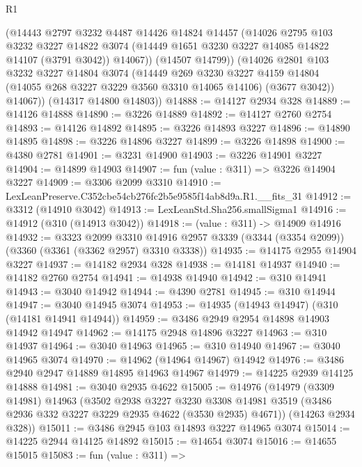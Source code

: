 \begin{lexlean}{R1}
\begin{coremodule}
          (@14443
            @2797
            @3232
            @4487
            @14426
            @14824
            @14457
            (@14026
              @2795
              @103
              @3232
              @3227
              @14822
              @3074
              (@14449 @1651 @3230 @3227 @14085 @14822 @14107 (@3791 @3042))
              @14067))
          (@14507 @14799))
        (@14026
          @2801
          @103
          @3232
          @3227
          @14804
          @3074
          (@14449
            @269
            @3230
            @3227
            @4159
            @14804
            (@14055 @268 @3227 @3229 @3560 @3310 @14065 @14106)
            (@3677 @3042))
          @14067))
      (@14317 @14800 @14803))
@14888 := @14127 @2934 @328
@14889 := @14126 @14888
@14890 := @3226 @14889
@14892 := @14127 @2760 @2754
@14893 := @14126 @14892
@14895 := @3226 @14893 @3227
@14896 := @14890 @14895
@14898 := @3226 @14896 @3227
@14899 := @3226 @14898
@14900 := @4380 @2781
@14901 := @3231 @14900
@14903 := @3226 @14901 @3227
@14904 := @14899 @14903
@14907 := fun (value : @311) => @3226 @14904 @3227
@14909 := @3306 @2099 @3310
@14910 := LexLeanPreserve.C352cbe54cb276fc2b5e9585f14ab8d9a.R1.__fits_31
@14912 := @3312 (@14910 @3042)
@14913 := LexLeanStd.Sha256.smallSigma1
@14916 := @14912 (@310 (@14913 @3042))
@14918 := (value : @311) -> @14909 @14916
@14932 := @3323
    @2099
    @3310
    @14916
    @2957
    @3339
    (@3344 (@3354 @2099))
    (@3360 (@3361 (@3362 @2957) @3310 @3338))
@14935 := @14175 @2955 @14904 @3227
@14937 := @14182 @2934 @328
@14938 := @14181 @14937
@14940 := @14182 @2760 @2754
@14941 := @14938 @14940
@14942 := @310 @14941
@14943 := @3040 @14942
@14944 := @4390 @2781
@14945 := @310 @14944
@14947 := @3040 @14945 @3074
@14953 := @14935 (@14943 @14947) (@310 (@14181 @14941 @14944))
@14959 := @3486 @2949 @2954 @14898 @14903 @14942 @14947
@14962 := @14175 @2948 @14896 @3227
@14963 := @310 @14937
@14964 := @3040 @14963
@14965 := @310 @14940
@14967 := @3040 @14965 @3074
@14970 := @14962 (@14964 @14967) @14942
@14976 := @3486 @2940 @2947 @14889 @14895 @14963 @14967
@14979 := @14225 @2939 @14125 @14888
@14981 := @3040 @2935 @4622
@15005 := @14976
    (@14979
      (@3309 @14981)
      @14963
      (@3502
        @2938
        @3227
        @3230
        @3308
        @14981
        @3519
        (@3486 @2936 @332 @3227 @3229 @2935 @4622 (@3530 @2935) @4671))
      (@14263 @2934 @328))
@15011 := @3486 @2945 @103 @14893 @3227 @14965 @3074
@15014 := @14225 @2944 @14125 @14892
@15015 := @14654 @3074
@15016 := @14655 @15015
@15083 := fun (value : @311) =>

\end{coremodule}
\end{lexlean}
